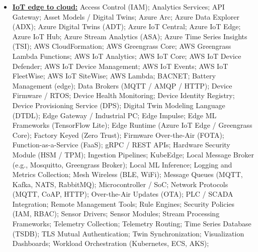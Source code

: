 \documentclass[letterpaper,11pt]{article}
\makeatletter
\newcommand{\resumeItem}[1]{
  \item\small{
    {#1 \vspace{-2pt}}
  }
}
\newcommand{\resumeSubheading}[4]{
  \vspace{-2pt}\item
    \begin{tabular*}{1.0\textwidth}[t]{l@{\extracolsep{\fill}}r}
      \textbf{#1}  \textit{\small#3} & \textbf{\small #2} \\
    \end{tabular*}\vspace{-7pt}
}
\newcommand{\resumeSubHeadingListStart}{\begin{itemize}[leftmargin=0.0in, label={}]}
\newcommand{\resumeSubHeadingListEnd}{\end{itemize}}
\newcommand{\resumeItemListStart}{\begin{itemize}}
\newcommand{\resumeItemListEnd}{\end{itemize}\vspace{-5pt}}
\makeatother
\begin{document}
\begin{multicols}{3}
{\begin{itemize}[leftmargin=0.1in, label={}, itemsep=0pt, parsep=0pt, topsep=0pt, partopsep=0pt]
\item
    \textbf{\uline{IoT edge to cloud:}} \hspace{0pt}
    Access Control (IAM);
    Analytics Services;
    API Gateway;
    Asset Models / Digital Twins;
    Azure Arc;
    Azure Data Explorer (ADX);
    Azure Digital Twins (ADT);
    Azure IoT Central;
    Azure IoT Edge;
    Azure IoT Hub;
    Azure Stream Analytics (ASA);
    Azure Time Series Insights (TSI);
    AWS CloudFormation;
    AWS Greengrass Core;
    AWS Greengrass Lambda Functions;
    AWS IoT Analytics;
    AWS IoT Core;
    AWS IoT Device Defender;
    AWS IoT Device Management;
    AWS IoT Events;
    AWS IoT FleetWise;
    AWS IoT SiteWise;
    AWS Lambda;
    BACNET;
    Battery Management (edge);
    Data Brokers (MQTT / AMQP / HTTP);
    Device Firmware / RTOS;
    Device Health Monitoring;
    Device Identity Registry;
    Device Provisioning Service (DPS);
    Digital Twin Modeling Language (DTDL);
    Edge Gateway / Industrial PC;
    Edge Impulse;
    Edge ML Frameworks (TensorFlow Lite);
    Edge Runtime (Azure IoT Edge / Greengrass Core);
    Factory Keyed (Zero Trust);
    Firmware Over-the-Air (FOTA);
    Function-as-a-Service (FaaS);
    gRPC / REST APIs;
    Hardware Security Module (HSM / TPM);
    Ingestion Pipelines;
    KubeEdge;
    Local Message Broker (e.g., Mosquitto, Greengrass Broker);
    Local ML Inference;
    Logging and Metrics Collection;
    Mesh Wireless (BLE, WiFi);
    Message Queues (MQTT, Kafka, NATS, RabbitMQ);
    Microcontroller / SoC;
    Network Protocols (MQTT, CoAP, HTTP);
    Over-the-Air Updates (OTA);
    PLC / SCADA Integration;
    Remote Management Tools;
    Rule Engines;
    Security Policies (IAM, RBAC);
    Sensor Drivers;
    Sensor Modules;
    Stream Processing Frameworks;
    Telemetry Collection;
    Telemetry Routing;
    Time Series Database (TSDB);
    TLS Mutual Authentication;
    Twin Synchronization;
    Visualization Dashboards;
    Workload Orchestration (Kubernetes, ECS, AKS);
\end{itemize}
}
\end{multicols}


\end{document}
